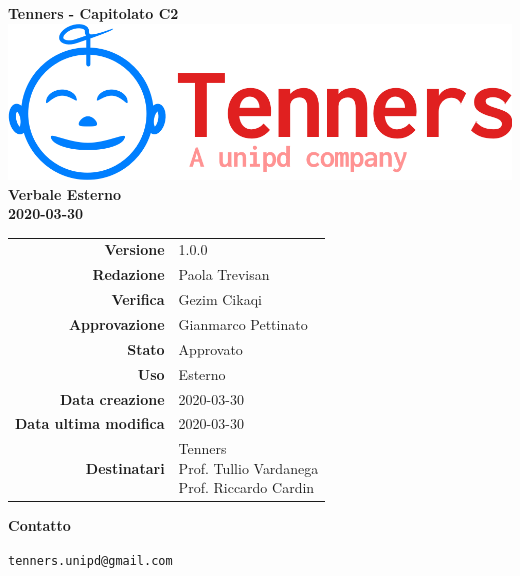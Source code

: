 \begin{titlepage}
	\begin{center}
		\large \textbf{Tenners - Capitolato C2}
		\vfill
		\includegraphics[scale = 0.3]{./res/img/logo.png}\\
		\vfill
		\Huge \textbf{Verbale Esterno} \\
		\textbf {2020-03-30}

        \vfill
        \large

        \begin{tabular}{r|l}
        	\textbf{Versione} & 1.0.0 \\
        	\textbf{Redazione} & Paola Trevisan \\
        	\textbf{Verifica} &  Gezim Cikaqi \\
        	\textbf{Approvazione} & Gianmarco Pettinato \\
        	\textbf{Stato} & Approvato \\
        	\textbf{Uso} &  Esterno\\
        	\textbf{Data creazione} &  2020-03-30\\
        	\textbf{Data ultima modifica} & 2020-03-30 \\
        	\textbf{Destinatari} & \parbox[t]{5cm}{Tenners \\ Prof. Tullio Vardanega\\ Prof. Riccardo Cardin}
        \end{tabular}
    	\vfill
    	\normalsize
    	\vfill
    	\textbf{Contatto}

    	\texttt{tenners.unipd@gmail.com}

	\end{center}
\end{titlepage}
